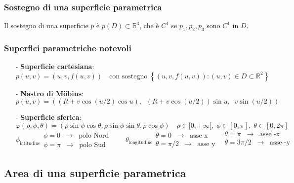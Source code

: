 \documentclass[a4paper]{article}
\newcommand\Rd{\mathbb{R}^2}  %
\newcommand\Rt{\mathbb{R}^3}  %
\begin{document}
\subsubsection*{Sostegno di una superficie parametrica}
Il sostegno di una superficie \(p\) è \(p(D) \subset \Rt\), che è \(C^1\) se \(p_1, p_2, p_3\) sono \(C^1\) in \(D\).

\subsubsection*{Superfici parametriche notevoli}
\begin{itemize}
	\item[-] \textbf{Superficie cartesiana}:
	\[p(u,v) = (u,v,f(u,v)) \quad \text{con sostegno} \; \left\{(u,v,f(u,v)) : (u,v) \in D \subset \Rd\right\}\]
	\item[-] \textbf{Nastro di Möbius}:
	\[p(u,v) = ((R + v \cos (u/2) \cos u), \;\; (R + v \cos (u/2)) \sin u, \;\; v \sin (u/2))\]
	\item[-] \textbf{Superficie sferica}:
	\[\varphi(\rho, \phi, \theta) = (\rho \sin \phi \cos \theta, \rho \sin \phi \sin \theta, \rho \cos \phi) \quad \rho \in [0,+\infty[, \; \phi \in [0, \pi], \; \theta \in [0, 2\pi]\]
	\[\phi_\text{latitudine} \begin{array}{l}
		\phi = 0 \;\; \rightarrow \;\; \text{polo Nord} \\
		\phi = \pi \;\;\rightarrow \;\; \text{polo Sud}
	\end{array} \qquad \theta_\text{longitudine} \begin{array}{l}
		\theta = 0 \;\; \rightarrow \;\; \text{asse x} \\
		\theta = \pi/2 \;\; \rightarrow \;\; \text{asse y}
	\end{array} \;\; \begin{array}{l}
		\theta = \pi \;\;\rightarrow \;\; \text{asse -x} \\
		\theta = 3\pi/2 \;\; \rightarrow \;\; \text{asse -y} \\
	\end{array}\]
\end{itemize}

\subsection{Area di una superficie parametrica}
\end{document}
